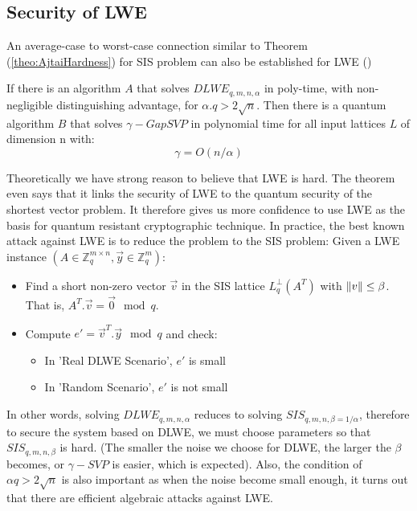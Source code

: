 \subsection{Security of LWE}
\label{sec:LWESecurity}
An average-case to worst-case connection similar to Theorem
(\ref{theo:AjtaiHardness}) for SIS problem can also be established for LWE
(\cite{regev2005lattices})
\begin{theorem}
  If there is an algorithm $A$ that solves $DLWE_{q,m,n,\alpha}$ in poly-time,
  with non-negligible distinguishing advantage, for $\alpha . q > 2
  \sqrt{n}$. Then there is a quantum algorithm $B$ that solves $\gamma-GapSVP$
  in polynomial time for all input lattices $L$ of dimension n with:
  \[
    \gamma = O(n/\alpha)
  \]

  \label{theo:RegevLWEHardness}
\end{theorem}
Theoretically we have strong reason to believe that LWE is hard. The theorem
even says that it links the security of LWE to the quantum security of the
shortest vector problem. It therefore gives us more confidence to use LWE as the
basis for quantum resistant cryptographic technique. In practice, the best known
attack against LWE is to reduce the problem to the SIS problem: Given a LWE
instance $(A \in \mathbb{Z}_q^{m \times n},\vec{y} \in \mathbb{Z}_q^m)$:
\begin{itemize}
\item Find a short non-zero vector $\vec{v}$ in the SIS lattice $L_q^\bot(A^T)$
  with $\Vert v \Vert \leq \beta$. That is, $A^T.\vec{v} = \vec{0} \mod q$.
\item Compute $e' = \vec{v}^T.\vec{y} \mod q$ and check:
  \begin{itemize}
  \item In 'Real DLWE Scenario', $e'$ is small
  \item In 'Random Scenario', $e'$ is not small
  \end{itemize}
\end{itemize}

In other words, solving $DLWE_{q,m,n,\alpha}$ reduces to solving
$SIS_{q,m,n,\beta=1/\alpha}$, therefore to secure the system based on DLWE, we
must choose parameters so that $SIS_{q,m,n,\beta}$ is hard. (The smaller the
noise we choose for DLWE, the larger the $\beta$ becomes, or $\gamma-SVP$ is
easier, which is expected).  Also, the condition of $\alpha q > 2\sqrt{n}$ is
also important as when the noise become small enough, it turns out that there
are efficient algebraic attacks against LWE.

